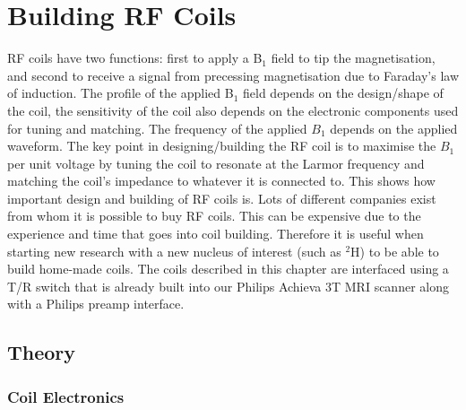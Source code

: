 \chapter{Building RF Coils}

\label{Chap:Coils}

\ac{RF} coils have two functions: first to apply a B$_1$ field to tip the magnetisation, and second to receive a signal from precessing magnetisation  due to Faraday's law of induction. The profile of the applied B$_1$ field depends on the design/shape of the coil, the sensitivity of the coil also depends on the electronic components used for tuning and matching. The frequency of the applied $B_1$ depends on the applied waveform. The key point in designing/building the \ac{RF} coil is to maximise the $B_1$ per unit voltage by tuning the coil to resonate at the Larmor frequency and matching the coil's impedance to whatever it is connected to. This shows how important design and building of \ac{RF} coils is. Lots of different companies exist from whom it is possible to buy \ac{RF} coils. This can be expensive due to the experience and time that goes into coil building. Therefore it is useful when starting new research with a new nucleus of interest (such as $^2$H) to be able to build home-made coils. The coils described in this chapter are interfaced using a T/R switch that is already built into our Philips Achieva 3T \ac{MRI} scanner along with a Philips preamp interface.

\section{Theory}

\subsection{Coil Electronics}




